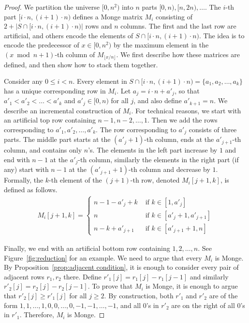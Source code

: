\documentclass{llncs}
\begin{document}
\begin{proof}


We partition the universe $[0,n^{2})$ into $n$ parts $[0,n),[n,2n),\ldots$. The $i$-th part $[i\cdot n,(i+1)\cdot n)$
defines a Monge matrix $M_{i}$ consisting of $2+|S\cap [i\cdot
n,(i+1)\cdot n)|$ rows and $n$ columns. The first and the last row are artificial, and others encode the
elements of $S\cap [i\cdot n,(i+1)\cdot n)$.
The idea is to encode the predecessor of $x\in [0,n^{2})$ by the
maximum element in the $(x\bmod n+1)$-th column
of $M_{\lfloor x/n\rfloor }$. 
 We first describe
how these matrices are defined, and then show how to stack them together.

Consider any $0 \leq i < n$. Every element in $S\cap
[i\cdot n,(i+1)\cdot n)=\{a_{1},a_{2},\ldots,a_{k}\}$ has a unique
corresponding row in $M_i$.
Let $a_{j}=i\cdot n + a'_{j}$, so that $a'_{1}<a'_{2}<\ldots < a'_{k}$
and $a'_{j}\in [0,n)$ for all $j$, and also define $a'_{k+1}=n$. We
describe an incremental construction of $M_i$.
For technical reasons, we start with an artificial top row containing $n-1,n-2,\ldots,1$. Then we add the rows corresponding
to $a'_{1},a'_{2},\ldots,a'_{k}$. The row corresponding to $a'_{j}$ consists of three parts. The middle part starts at the
$(a'_{j}+1)$-th column, ends at the $a'_{j+1}$-th column, and contains only $n$'s. The elements in the left part 
increase by $1$ and end with $n-1$ at the $a'_j$-th column, similarly
the elements in the right part (if any) start with $n-1$ at the
$(a'_{j+1} + 1)$-th column and decrease by $1$.
Formally, the $k$-th element of the $(j+1)$-th row, denoted $M_{i}[j+1,k]$, is defined as follows.
\begin{eqnarray}
\label{eqn:M_i}
M_{i}[j+1,k]=\begin{cases}
n-1-a'_{j}+k &\mbox{ if } k\in [1,a'_{j}] \\
n &\mbox{ if } k\in [a'_{j}+1,a'_{j+1}] \\
n-k+a'_{j+1} &\mbox{ if } k\in [a'_{j+1}+1,n]
\end{cases}
\end{eqnarray}


Finally, we end with an artificial bottom row containing $1,2,\ldots,n$.
See Figure~\ref{fig:reduction} for an example. We need to argue that every $M_{i}$ is Monge. By
Proposition~\ref{prop:adjacent condition}, it is enough to consider every pair of adjacent rows $r_{1},r_{2}$ there.
Define $r'_{1}[j]=r_{1}[j]-r_{1}[j-1]$ and similarly $r'_{2}[j]=r_{2}[j]-r_{2}[j-1]$. To prove that $M_{i}$ is Monge, it is
enough to argue that $r'_{2}[j]\geq r'_{1}[j]$ for all $j\geq 2$. By construction, both $r'_{1}$ and $r'_{2}$ are of the form
$1,1,\ldots,1,0,0,\ldots,0,-1,-1,\ldots,-1$, and all $0$'s in $r'_{2}$ are on the right of all $0$'s in $r'_{1}$.
Therefore, $M_{i}$ is Monge.


\end{proof}
\end{document}
